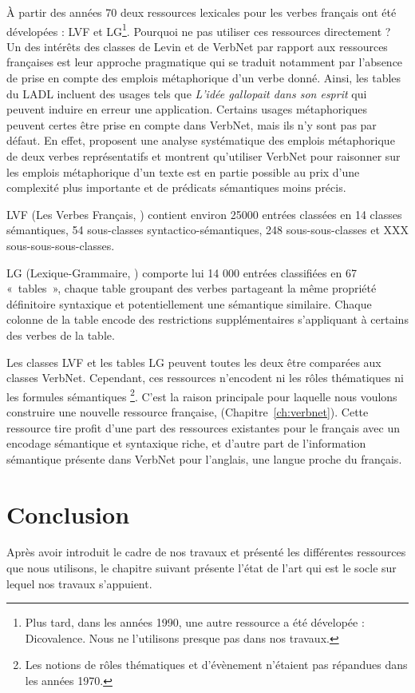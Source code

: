 À partir des années 70 deux ressources lexicales pour les verbes français ont
été dévelopées : LVF et LG\footnote{Plus tard, dans les années 1990, une autre
ressource a été dévelopée : Dicovalence. Nous ne l'utilisons presque pas dans
nos travaux.}. Pourquoi ne pas utiliser ces ressources directement ? Un des
intérêts des classes de Levin et de VerbNet par rapport aux ressources
françaises est leur approche pragmatique qui se traduit notamment par l'absence
de prise en compte des emplois métaphorique d'un verbe donné. Ainsi, les tables
du LADL incluent des usages tels que \textit{L'idée gallopait dans son esprit}
qui peuvent induire en erreur une application. Certains usages métaphoriques
peuvent certes être prise en compte dans VerbNet, mais ils n'y sont pas par
défaut. En effet, \cite{brown2012semantic} proposent une analyse systématique
des emplois métaphorique de deux verbes représentatifs et montrent qu'utiliser
VerbNet pour raisonner sur les emplois métaphorique d'un texte est en partie
possible au prix d'une complexité plus importante et de prédicats sémantiques
moins précis.

LVF (Les Verbes Français, \cite{dubois1997verbes}) contient environ 25000
entrées classées en 14 classes sémantiques, 54 sous-classes
syntactico-sémantiques, 248 sous-sous-classes et XXX sous-sous-sous-classes.


LG (Lexique-Grammaire, \cite{gross1975methodes,boons1976structure}) comporte
lui 14 000 entrées classifiées en 67 «~tables~», chaque table groupant des
verbes partageant la même propriété définitoire syntaxique et potentiellement
une sémantique similaire. Chaque colonne de la table encode des restrictions
supplémentaires s'appliquant à certains des verbes de la table.



Les classes LVF et les tables LG peuvent toutes les deux être comparées aux
classes VerbNet. Cependant, ces ressources n'encodent ni les rôles thématiques
ni les formules sémantiques \footnote{Les notions de rôles thématiques et
d'évènement n'étaient pas répandues dans les années 1970.}.  C'est la raison
principale pour laquelle nous voulons construire une nouvelle ressource
française, \verbenet{} (Chapitre~\ref{ch:verbnet}). Cette ressource tire profit
d'une part des ressources existantes pour le français avec un encodage
sémantique et syntaxique riche, et d'autre part de l'information sémantique
présente dans VerbNet pour l'anglais, une langue proche du français.

\section*{Conclusion}

Après avoir introduit le cadre de nos travaux et présenté les différentes
ressources que nous utilisons, le chapitre suivant présente l'état de l'art qui
est le socle sur lequel nos travaux s'appuient.
